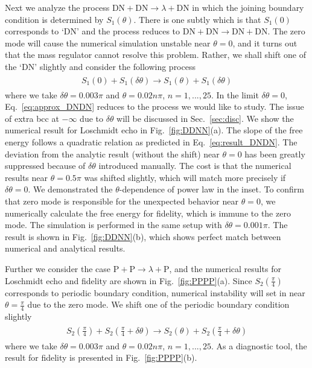 Next we analyze the process $\text{DN}+\text{DN}\rightarrow\lambda+\text{DN}$ in which the joining boundary condition is determined by $S_1(\theta)$. There is one subtly which is that $S_1(0)$ corresponds to `DN' and the process reduces to $\text{DN}+\text{DN}\rightarrow\text{DN}+\text{DN}$. The zero mode will cause the numerical simulation unstable near $\theta=0$, and it turns out that the mass regulator cannot resolve this problem. Rather, we shall shift one of the `DN' slightly and consider the following process
\begin{eqnarray}\begin{aligned}
\label{eq:approx_DNDN}
S_1(0)+S_1(\delta\theta)\rightarrow S_1(\theta)+S_1(\delta\theta)
\end{aligned}\end{eqnarray}
where we take $\delta\theta=0.003\pi$ and $\theta=0.02n\pi$, $n=1,...,25$. In the limit $\delta\theta=0$, Eq.~\eqref{eq:approx_DNDN} reduces to the process we would like to study. The issue of extra bcc at $-\infty$ due to $\delta\theta$ will be discussed in Sec.~\ref{sec:disc}. We show the numerical result for Loschmidt echo in Fig.~\ref{fig:DDNN}(a). The slope of the free energy follows a quadratic relation as predicted in Eq.~\eqref{eq:result_DNDN}. The deviation from the analytic result (without the shift) near $\theta=0$ has been greatly suppressed because of $\delta\theta$ introduced manually. The cost is that the numerical results near $\theta=0.5\pi$ was shifted slightly, which will match more precisely if $\delta\theta=0$. We demonstrated the $\theta$-dependence of power law in the inset. To confirm that zero mode is responsible for the unexpected behavior near $\theta=0$, we numerically calculate the free energy for fidelity, which is immune to the zero mode. The simulation is performed in the same setup with  $\delta\theta=0.001\pi$. The result is shown in Fig.~\ref{fig:DDNN}(b), which shows perfect match between numerical and analytical results. 

Further we consider the case $\text{P}+\text{P}\rightarrow\lambda+\text{P}$, and the numerical results for Loschmidt echo and fidelity are shown in Fig.~\ref{fig:PPPP}(a). Since $S_2(\frac{\pi}{4})$ corresponds to periodic boundary condition, numerical instability will set in near $\theta=\frac{\pi}{4}$ due to the zero mode. We shift one of the periodic boundary condition slightly 
\begin{eqnarray}\begin{aligned}
\label{eq:approx_DNDN}
S_2\left(\frac{\pi}{4}\right)+S_2\left(\frac{\pi}{4}+\delta\theta\right)\rightarrow S_2(\theta)+S_2\left(\frac{\pi}{4}+\delta\theta\right)
\end{aligned}\end{eqnarray}
where we take $\delta\theta=0.003\pi$ and $\theta=0.02n\pi$, $n=1,...,25$. 
As a diagnostic tool, the result for fidelity is presented in Fig.~\ref{fig:PPPP}(b). 

